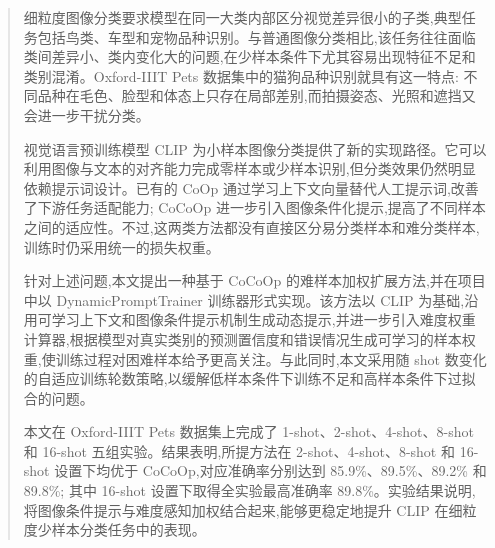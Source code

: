 \begin{abstract}

细粒度图像分类要求模型在同一大类内部区分视觉差异很小的子类,典型任务包括鸟类、车型和宠物品种识别。与普通图像分类相比,该任务往往面临类间差异小、类内变化大的问题,在少样本条件下尤其容易出现特征不足和类别混淆。Oxford-IIIT Pets 数据集中的猫狗品种识别就具有这一特点: 不同品种在毛色、脸型和体态上只存在局部差别,而拍摄姿态、光照和遮挡又会进一步干扰分类。

视觉语言预训练模型 CLIP 为小样本图像分类提供了新的实现路径。它可以利用图像与文本的对齐能力完成零样本或少样本识别,但分类效果仍然明显依赖提示词设计。已有的 CoOp 通过学习上下文向量替代人工提示词,改善了下游任务适配能力; CoCoOp 进一步引入图像条件化提示,提高了不同样本之间的适应性。不过,这两类方法都没有直接区分易分类样本和难分类样本,训练时仍采用统一的损失权重。

针对上述问题,本文提出一种基于 CoCoOp 的难样本加权扩展方法,并在项目中以 DynamicPromptTrainer 训练器形式实现。该方法以 CLIP 为基础,沿用可学习上下文和图像条件提示机制生成动态提示,并进一步引入难度权重计算器,根据模型对真实类别的预测置信度和错误情况生成可学习的样本权重,使训练过程对困难样本给予更高关注。与此同时,本文采用随 shot 数变化的自适应训练轮数策略,以缓解低样本条件下训练不足和高样本条件下过拟合的问题。

本文在 Oxford-IIIT Pets 数据集上完成了 1-shot、2-shot、4-shot、8-shot 和 16-shot 五组实验。结果表明,所提方法在 2-shot、4-shot、8-shot 和 16-shot 设置下均优于 CoCoOp,对应准确率分别达到 85.9\%、89.5\%、89.2\% 和 89.8\%; 其中 16-shot 设置下取得全实验最高准确率 89.8\%。实验结果说明,将图像条件提示与难度感知加权结合起来,能够更稳定地提升 CLIP 在细粒度少样本分类任务中的表现。


\end{abstract}

